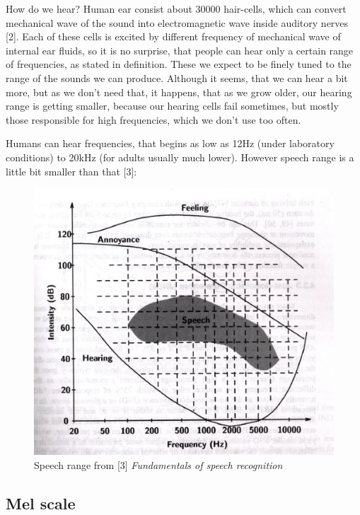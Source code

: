 \documentclass[12pt,a4paper,english]{article}
\begin{document}
How do we hear? Human ear consist about 30000 hair-cells, which can convert mechanical wave of the sound into electromagnetic wave inside auditory nerves [2]. 
Each of these cells is excited by different frequency of mechanical wave of internal ear fluids, so it is no surprise, that people can hear only a certain range of frequencies, as stated in definition. These we expect to be finely tuned to the range of the sounds we can produce. Although it seems, that we can hear a bit more, but as we don't need that, it happens, that as we grow older, our hearing range is getting smaller, because our hearing cells fail sometimes, but mostly those responsible for high frequencies, which we don't use too often.\newline

Humans can hear frequencies, that begins as low as 12Hz (under laboratory conditions) to 20kHz (for adults usually much lower). However speech range is a little bit smaller than that [3]: \newline

\begin{figure}[hb]
    \centering
    \includegraphics[scale=0.5]{speech_range.jpg}
    \caption[]{Speech range from [3] \emph{Fundamentals of speech recognition}}
\end{figure}


\newpage
\subsection{Mel scale}
\end{document}
